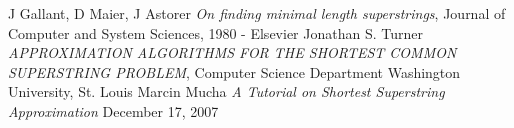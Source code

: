 \documentclass[11pt,a4paper]{article}
\begin{document}
\begin{thebibliography}{9}
 J Gallant, D Maier, J Astorer
  \emph{ On finding minimal length superstrings},
  Journal of Computer and System Sciences, 1980 - Elsevier
  Jonathan S. Turner
  \emph{ APPROXIMATION ALGORITHMS FOR THE SHORTEST COMMON SUPERSTRING PROBLEM},
  Computer Science Department Washington University, St. Louis
Marcin Mucha
  \emph{A Tutorial on Shortest Superstring Approximation}
  December 17, 2007
\end{thebibliography}
\end{document}
